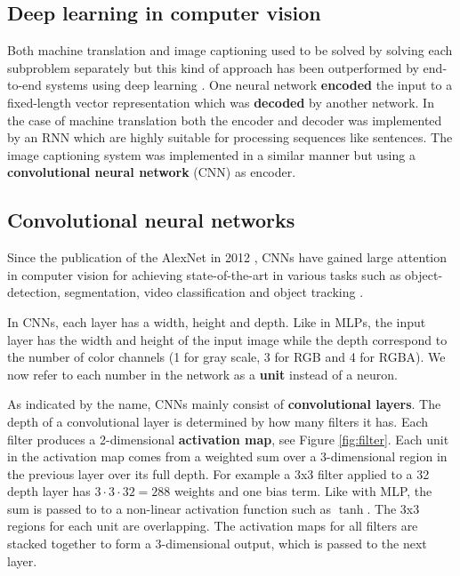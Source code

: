\subsection{Deep learning in computer vision}

Both machine translation and image captioning used to be solved by solving each subproblem separately but this kind of approach has been outperformed by end-to-end systems using deep learning \cite{ShowAndTell}. One neural network \textbf{encoded} the input to a fixed-length vector representation which was \textbf{decoded} by another network. In the case of machine translation both the encoder and decoder was implemented by an RNN which are highly suitable for processing sequences like sentences. The image captioning system was implemented in a similar manner but using a \textbf{convolutional neural network} (CNN) as encoder.


\subsection{Convolutional neural networks}

Since the publication of the AlexNet in 2012 \cite{AlexNet}, CNNs have gained large attention in computer vision for achieving state-of-the-art in various tasks such as object-detection, segmentation, video classification and object tracking \cite{InceptionV3}.




In CNNs, each layer has a width, height and depth. Like in MLPs, the input layer has the width and height of the input image while the depth correspond to the number of color channels (1 for gray scale, 3 for RGB and 4 for RGBA). We now refer to each number in the network as a \textbf{unit} instead of a neuron.

As indicated by the name, CNNs mainly consist of \textbf{convolutional layers}. The depth of a convolutional layer is determined by how many filters it has. Each filter produces a 2-dimensional \textbf{activation map}, see Figure \ref{fig:filter}. Each unit in the activation map comes from a weighted sum over a 3-dimensional region in the previous layer over its full depth. For example a 3x3 filter applied to a 32 depth layer has $3 \cdot 3 \cdot 32=288$ weights and one bias term.
Like with MLP, the sum is passed to to a non-linear activation function such as $\tanh$. The 3x3 regions for each unit are overlapping.
The activation maps for all filters are stacked together to form a 3-dimensional output, which is passed to the next layer.

